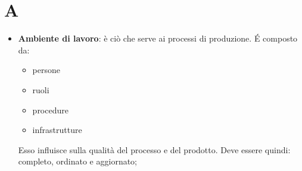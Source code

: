 % 
%
%
\section{A}

\begin{itemize}
	\item \textbf{Ambiente di lavoro}: è ciò che serve ai processi di produzione. \'E composto da:
		\begin{itemize}
			\item persone
			\item ruoli
			\item procedure
			\item infrastrutture
		\end{itemize}
	\noindent
	Esso influisce sulla qualità del processo e del prodotto. Deve essere quindi: completo, ordinato e aggiornato;


\end{itemize}
